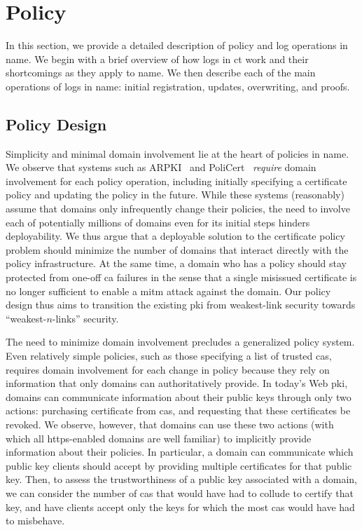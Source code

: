 \section{Policy}
\label{sec:policy}

In this section, we provide a detailed description of policy and log operations
in \ac{name}. We begin with a brief overview of how logs in \ac{ct} work and
their shortcomings as they apply to \ac{name}. We then describe each of the main
operations of logs in \ac{name}: initial registration, updates, overwriting, and
proofs.

\subsection{Policy Design}

Simplicity and minimal domain involvement lie at the heart of policies in
\ac{name}. We observe that systems such as ARPKI~\cite{basin2014arpki} and
PoliCert~\cite{szalachowski2014policert} \emph{require} domain involvement for
each policy operation, including initially specifying a certificate policy and
updating the policy in the future. While these systems (reasonably) assume that
domains only infrequently change their policies, the need to involve each of
potentially millions of domains even for its initial steps hinders
deployability. We thus argue that a deployable solution to the certificate
policy problem should minimize the number of domains that interact directly with
the policy infrastructure. At the same time, a domain who has a policy should
stay protected from one-off \ac{ca} failures in the sense that a single
misissued certificate is no longer sufficient to enable a \ac{mitm} attack
against the domain. Our policy design thus aims to transition the existing
\ac{pki} from weakest-link security towards ``weakest-$n$-links'' security.

The need to minimize domain involvement precludes a generalized policy system.
Even relatively simple policies, such as those specifying a list of trusted
\acp{ca}, requires domain involvement for each change in policy because they
rely on information that only domains can authoritatively provide. In today's
Web \ac{pki}, domains can communicate information about their public keys
through only two actions: purchasing certificate from \acp{ca}, and requesting
that these certificates be revoked. We observe, however, that domains can use
these two actions (with which all \ac{https}-enabled domains are well familiar)
to implicitly provide information about their policies. In particular, a domain
can communicate which public key clients should accept by providing multiple
certificates for that public key. Then, to assess the trustworthiness of a
public key associated with a domain, we can consider the number of \acp{ca} that
would have had to collude to certify that key, and have clients accept only the
keys for which the most \acp{ca} would have had to misbehave.

